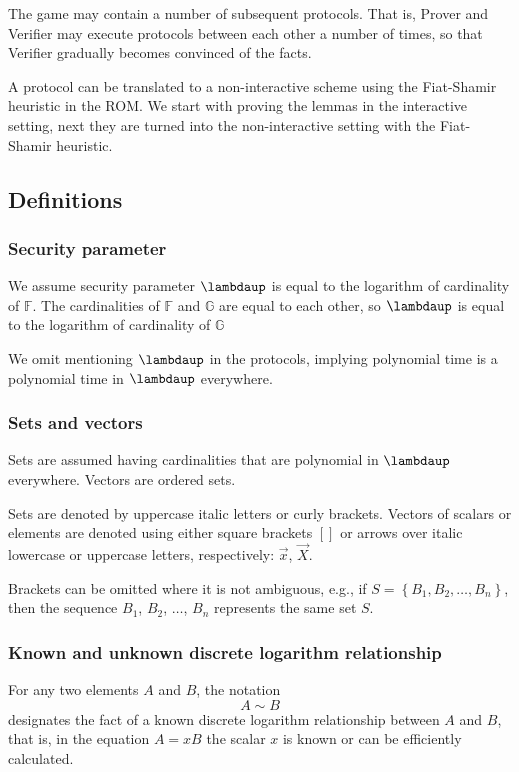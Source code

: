 \documentclass{mathcryptology} %
\theoremstyle{title}
\theoremstyle{titleof}
\begin{document}
    The game may contain a number of subsequent protocols. That is, Prover and Verifier may execute protocols between each other a number of times, so that Verifier gradually becomes convinced of the facts.

    A protocol can be translated to a non-interactive scheme using the Fiat-Shamir heuristic in the ROM. We start with proving the lemmas in the interactive setting, next they are turned into the non-interactive setting with the Fiat-Shamir heuristic.


\subsection{Definitions}


\subsubsection{Security parameter}
    We assume security parameter $\bm{\lambdaup}$ is equal to the logarithm of cardinality of $\mathds{F}$. The cardinalities of $\mathds{F}$ and $\mathds{G}$ are equal to each other, so $\bm{\lambdaup}$ is equal to the logarithm of cardinality of $\mathds{G}$
    
    We omit mentioning $\bm{\lambdaup}$ in the protocols, implying polynomial time is a polynomial time in $\bm{\lambdaup}$ everywhere.     


\subsubsection{Sets and vectors}
    Sets are assumed having cardinalities that are polynomial in $\bm{\lambdaup}$ everywhere. Vectors are ordered sets.

    Sets are denoted by uppercase italic letters or curly brackets. Vectors of scalars or elements are denoted using either square brackets $[]$ or arrows over italic lowercase or uppercase letters, respectively: $\vec{x}$, $\vec{X}$.

    Brackets can be omitted where it is not ambiguous, e.g., if $S=\left\{ B_{1}, B_{2}, \dots, B_{n}\right\}$, then the sequence $B_{1}$, $B_{2}$, ${\dots}$, $B_{n}$ represents the same set $S$.


\subsubsection{Known and unknown discrete logarithm relationship}
    For any two elements $A$ and $B$, the notation
    \begin{equation*}
        A\sim B
    \end{equation*}
    designates the fact of a known discrete logarithm relationship between $A$ and $B$, that is, in the equation $A=xB$ the scalar $x$ is known or can be efficiently calculated.
\end{document}
